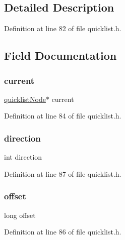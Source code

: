 \subsection{Detailed Description}


Definition at line 82 of file quicklist.\+h.



\subsection{Field Documentation}
\mbox{\label{structquicklist_iter_a5e0e4458fdbf71c9a0683ac803fc70e6}} 
\subsubsection{\texorpdfstring{current}{current}}
{\footnotesize\ttfamily \hyperlink{structquicklist_node}{quicklist\+Node}$\ast$ current}



Definition at line 84 of file quicklist.\+h.

\mbox{\label{structquicklist_iter_a886d551d5381dc3e53f17825ffc51641}} 
\subsubsection{\texorpdfstring{direction}{direction}}
{\footnotesize\ttfamily int direction}



Definition at line 87 of file quicklist.\+h.

\mbox{\label{structquicklist_iter_adcce6ee751c1469525aec834a4d37ea8}} 
\subsubsection{\texorpdfstring{offset}{offset}}
{\footnotesize\ttfamily long offset}



Definition at line 86 of file quicklist.\+h.


